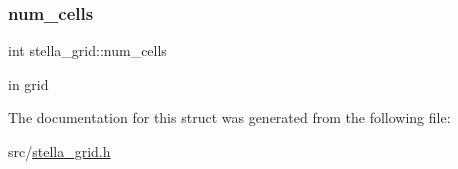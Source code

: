 \subsubsection{\texorpdfstring{num\+\_\+cells}{num\_cells}}
{\footnotesize\ttfamily int stella\+\_\+grid\+::num\+\_\+cells}

in grid 

The documentation for this struct was generated from the following file\+:\begin{DoxyCompactItemize}
\item 
src/\mbox{\hyperlink{stella__grid_8h}{stella\+\_\+grid.\+h}}\end{DoxyCompactItemize}
